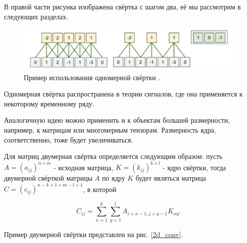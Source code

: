 \documentclass[12pt, fleqn]{article}
\begin{document}
    В правой части рисунка изображена свёртка с шагом два, её мы рассмотрим в следующих разделах.

    \begin{figure}[ht]
        \centering
        \includegraphics[scale=0.5]{pics/1d_conv.png}
        \caption{Пример использования одномерной свёртки \cite{cs231n}.}
        \label{1d_conv}
    \end{figure}

    Одномерная свёртка распространена в теории сигналов, где она применяется к некоторому временному ряду. 
        
    Аналогичную идею можно применить и к объектам большей размерности, например, к матрицам или
    многомерным тензорам. Размерность ядра, соответственно, тоже будет увеличиваться. 
    
    Для матриц двумерная свёртка определяется следующим образом: пусть $A = (a_{ij})^{n \times m}$ - исходная
    матрица, $K = (k_{ij})^{k \times l}$ - ядро свёртки, тогда двумерной свёрткой матрицы $A$ по
    ядру $K$ будет являться матрица $C=(c_{ij})^{n-k+1 \times m-l+1}$, в которой

    $$C_{ij} = \sum_{x=1}^{k}\sum_{y=1}^{l}A_{i+x-1,j+y-1}K_{xy}.$$

    Пример двумерной свёртки представлен на рис. \ref{2d_conv}.
\end{document}
